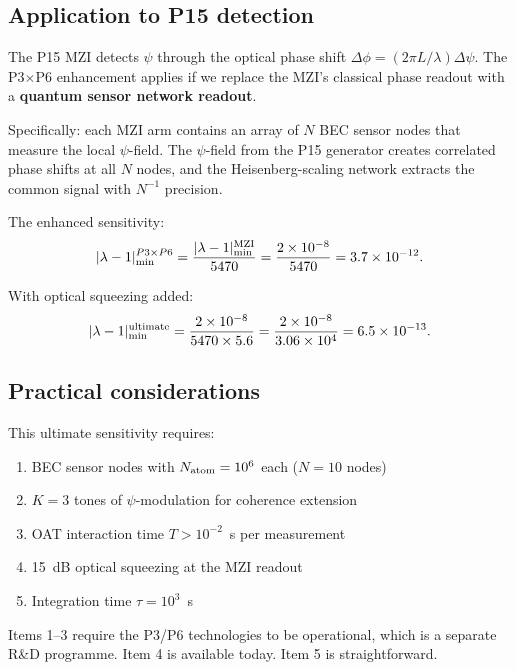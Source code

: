\documentclass[11pt]{article}
\newcommand{\ee}[1]{\times 10^{#1}}
\newcommand{\lam}{\lambda}
\begin{document}
\subsection{Application to P15 detection}

The P15 MZI detects $\psi$ through the optical phase shift
$\Delta\phi = (2\pi L/\lambda)\Delta\psi$. The P3$\times$P6
enhancement applies if we replace the MZI's classical phase
readout with a \textbf{quantum sensor network readout}.

Specifically: each MZI arm contains an array of $N$ BEC sensor
nodes that measure the local $\psi$-field. The $\psi$-field from
the P15 generator creates correlated phase shifts at all $N$ nodes,
and the Heisenberg-scaling network extracts the common signal with
$N^{-1}$ precision.

The enhanced sensitivity:
\begin{equation}
|\lam-1|_{\rm min}^{P3\times P6} = \frac{|\lam-1|_{\rm min}^{\rm MZI}}
{5470} = \frac{2\ee{-8}}{5470} = 3.7\ee{-12}.
\end{equation}

With optical squeezing added:
\begin{equation}
|\lam-1|_{\rm min}^{\rm ultimate} = \frac{2\ee{-8}}{5470 \times 5.6}
= \frac{2\ee{-8}}{3.06\ee{4}} = 6.5\ee{-13}.
\end{equation}

\subsection{Practical considerations}

This ultimate sensitivity requires:
\begin{enumerate}[nosep]
\item BEC sensor nodes with $N_{\rm atom} = 10^6$ each ($N = 10$ nodes)
\item $K = 3$ tones of $\psi$-modulation for coherence extension
\item OAT interaction time $T > 10^{-2}$~s per measurement
\item 15~dB optical squeezing at the MZI readout
\item Integration time $\tau = 10^3$~s
\end{enumerate}

Items 1--3 require the P3/P6 technologies to be operational, which
is a separate R\&D programme. Item 4 is available today. Item 5 is
straightforward.
\end{document}
